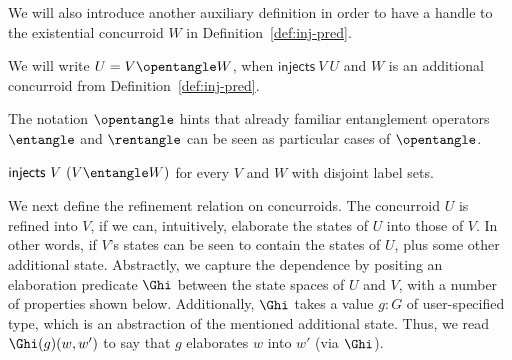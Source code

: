 We will also introduce another auxiliary definition in order to have a
handle to the existential concurroid $W$ in
Definition~\ref{def:inj-pred}.

\begin{definition}
\label{def:bbt}
%
We will write $U = V \opentangle W$, when $\mathsf{injects}~V~U$ and
$W$ is an additional concurroid from Definition~\ref{def:inj-pred}. 
\end{definition}

The notation $\opentangle$ hints that already familiar entanglement
operators $\entangle$ and $\rentangle$ can be seen as particular cases
of $\opentangle$.

\begin{lemma}$\mathsf{injects}~V~{(V \entangle W)}$ for every $V$ and $W$ with disjoint label sets. \end{lemma}

We next define the refinement relation on concurroids. The concurroid
$U$ is refined into $V$, if we can, intuitively, elaborate the states
of $U$ into those of $V$. In other words, if $V$'s states can be seen
to contain the states of $U$, plus some other additional
state. Abstractly, we capture the dependence by positing an
elaboration predicate $\Ghi$ between the state spaces of $U$ and
$V$, with a number of properties shown below. Additionally, $\Ghi$
takes a value $g : G$ of user-specified type, which is an abstraction
of the mentioned additional state. Thus, we read $\Ghi(g)(w, w')$
to say that $g$ elaborates $w$ into $w'$ (via $\Ghi$).

